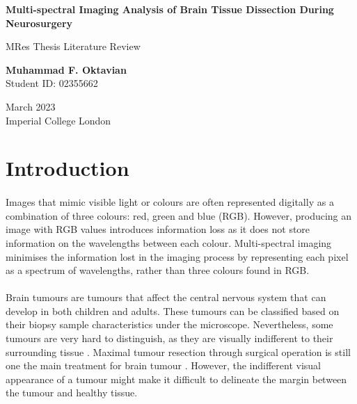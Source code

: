 \documentclass[12pt]{article}
\begin{document}
\begin{center}
    \textbf{\Large Multi-spectral Imaging Analysis of Brain Tissue Dissection During Neurosurgery}

    \vspace{0.5cm}
    {\large MRes Thesis Literature Review}
         
    \vspace{1cm}
    \textbf{Muhammad F. Oktavian} \\
    Student ID: 02355662

    \vspace{0.5cm}
    March 2023 \\
    Imperial College London
\end{center}


\section{Introduction}
    \paragraph{}
    Images that mimic visible light or colours are often represented digitally as a combination of three colours: red, green and blue (RGB). However, producing an image with RGB values introduces information loss as it does not store information on the wavelengths between each colour. Multi-spectral imaging minimises the information lost in the imaging process by representing each pixel as a spectrum of wavelengths, rather than three colours found in RGB.
    
    \paragraph{}
    Brain tumours are tumours that affect the central nervous system that can develop in both children and adults. These tumours can be classified based on their biopsy sample characteristics under the microscope. Nevertheless, some tumours are very hard to distinguish, as they are visually indifferent to their surrounding tissue \cite{collins_brain_2004}. Maximal tumour resection through surgical operation is still one the main treatment for brain tumour \cite{bush_current_2017}. However, the indifferent visual appearance of a tumour might make it difficult to delineate the margin between the tumour and healthy tissue.
\end{document}
